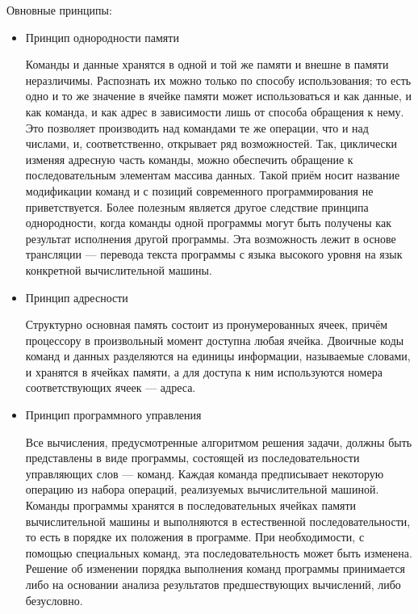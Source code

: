 \documentclass{article}
\begin{document}

Овновные принципы:
\begin{itemize}
    \item Принцип однородности памяти
    
    Команды и данные хранятся в одной и той же памяти и внешне в памяти неразличимы. Распознать их можно только по способу использования; то есть одно и то же значение в ячейке памяти может использоваться и как данные, и как команда, и как адрес в зависимости лишь от способа обращения к нему. Это позволяет производить над командами те же операции, что и над числами, и, соответственно, открывает ряд возможностей. Так, циклически изменяя адресную часть команды, можно обеспечить обращение к последовательным элементам массива данных. Такой приём носит название модификации команд и с позиций современного программирования не приветствуется. Более полезным является другое следствие принципа однородности, когда команды одной программы могут быть получены как результат исполнения другой программы. Эта возможность лежит в основе трансляции — перевода текста программы с языка высокого уровня на язык конкретной вычислительной машины.
    
    \item Принцип адресности
    
    Структурно основная память состоит из пронумерованных ячеек, причём процессору в произвольный момент доступна любая ячейка. Двоичные коды команд и данных разделяются на единицы информации, называемые словами, и хранятся в ячейках памяти, а для доступа к ним используются номера соответствующих ячеек — адреса.
    
    \item Принцип программного управления
    
    Все вычисления, предусмотренные алгоритмом решения задачи, должны быть представлены в виде программы, состоящей из последовательности управляющих слов — команд. Каждая команда предписывает некоторую операцию из набора операций, реализуемых вычислительной машиной. Команды программы хранятся в последовательных ячейках памяти вычислительной машины и выполняются в естественной последовательности, то есть в порядке их положения в программе. При необходимости, с помощью специальных команд, эта последовательность может быть изменена. Решение об изменении порядка выполнения команд программы принимается либо на основании анализа результатов предшествующих вычислений, либо безусловно.
\end{itemize}
\end{document}
